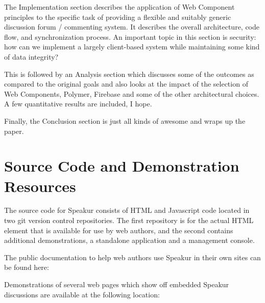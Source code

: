 The Implementation section describes the application of Web Component principles to the specific task of providing a flexible and suitably generic discussion forum / commenting system. 
It describes the overall architecture, code flow, and synchronization process. 
An important topic in this section is security: how can we implement a largely client-based system while maintaining some kind of data integrity?

This is followed by an Analysis section which discusses some of the outcomes as compared to the original goals and also looks at the impact of the selection of Web Components, Polymer, Firebase and some of the other architectural choices. A few quantitative results are included, I hope.

Finally, the Conclusion section is just all kinds of awesome and wraps up the paper. 

\section{Source Code and Demonstration Resources}
%

The source code for Speakur consists of HTML and Javascript code located in two git version control repositories. The first repository is for the actual
HTML element that is available for use by web authors, and the second contains additional demonstrations, a standalone application and a management console.

The public documentation to help web authors use Speakur in their own sites can be found here:


Demonstrations of several web pages which show off embedded Speakur discussions are available at the following location:


